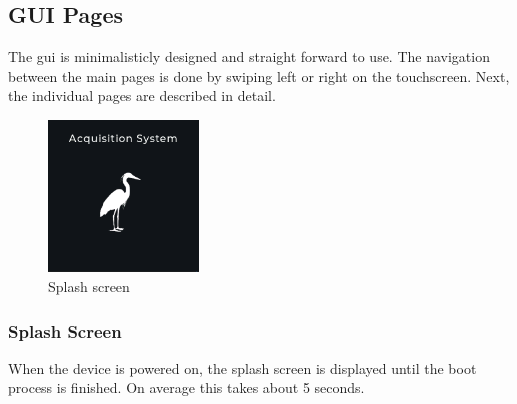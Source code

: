 \subsection{GUI Pages}
The \acrshort{gui} is minimalisticly designed and straight forward to use.
The navigation between the main pages is done by swiping left or right on the touchscreen.
Next, the individual pages are described in detail.

\begin{minipage}{\linewidth}
	\begin{figure}
		\vspace{-0.6cm}
		\includegraphics[width=4cm]{images/4_design_acquisition_system/gui/01_splash_screen.png}
		\centering
		\caption{Splash screen}
		\label{fig:acquisition_system_gui_splash_screen}
	\end{figure}
	\subsubsection{Splash Screen}
	When the device is powered on, the splash screen is displayed until the boot process is finished.
	On average this takes about 5 seconds.
\end{minipage}
\vspace{2.2cm}

